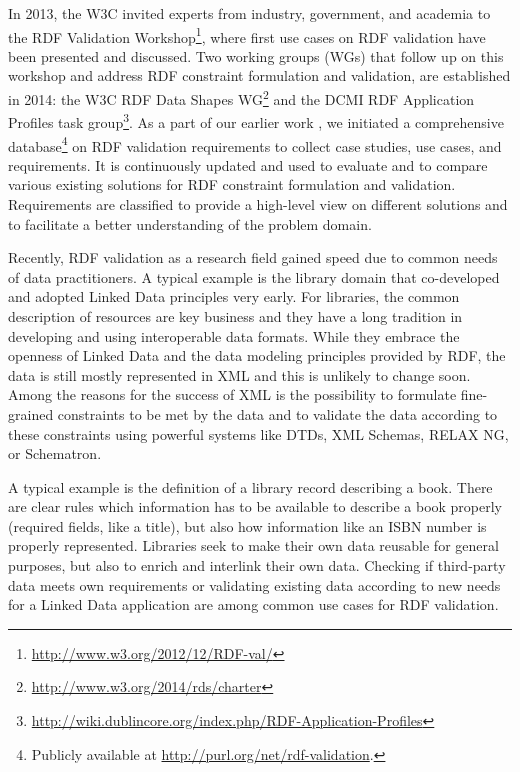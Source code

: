 \documentclass{llncs}
\begin{document}
In 2013, the W3C invited experts from industry, government, and academia to the RDF Validation Workshop\footnote{\url{http://www.w3.org/2012/12/RDF-val/}}, 
where first use cases on RDF validation have been presented and discussed. 
Two working groups (WGs) that follow up on this workshop and address RDF constraint formulation and validation, are established in 2014: 
the W3C RDF Data Shapes WG\footnote{\url{http://www.w3.org/2014/rds/charter}} and the DCMI RDF Application Profiles task group\footnote{\url{http://wiki.dublincore.org/index.php/RDF-Application-Profiles}}. 
As a part of our earlier work \cite{BoschEckert2014}, we initiated a comprehensive database\footnote{Publicly available at \url{http://purl.org/net/rdf-validation}.} on RDF validation requirements to collect case studies, use cases, and requirements. It is continuously updated and used to evaluate and to compare various existing solutions for RDF constraint formulation and validation. 
Requirements are classified to provide a high-level view on different solutions and to facilitate a better understanding of the problem domain.  




Recently, RDF validation as a research field gained speed due to common needs of data practitioners. A typical example is the library domain that co-developed and adopted Linked Data principles very early. For libraries, the common description of resources are key business and they have a long tradition in developing and using interoperable data formats. While they embrace the openness of Linked Data and the data modeling principles provided by RDF, the data is still mostly represented in XML and this is unlikely to change soon. 
Among the reasons for the success of XML is the possibility to formulate fine-grained constraints to be met by the data and to validate the data according to these constraints using powerful systems like DTDs, XML Schemas, RELAX NG, or Schematron.

A typical example is the definition of a library record describing a book. There are clear rules which information has to be available to describe a book properly (required fields, like a title), but also how information like an ISBN number is properly represented. Libraries seek to make their own data reusable for general purposes, but also to enrich and interlink their own data. Checking if third-party data meets own requirements or validating existing data according to new needs for a Linked Data application are among common use cases for RDF validation.
\end{document}

